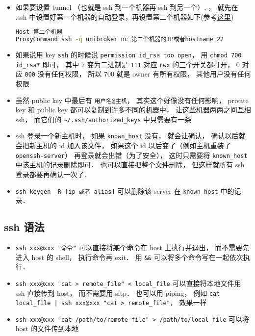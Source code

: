 \begin{itemize}
\item 如果要设置 tunnel （也就是 ssh 到一个机器再 ssh 到另一个）, ， 就先在 .ssh 中设置好第一个机器的自动登录，再设置第二个机器如下(参考\href{https://askubuntu.com/questions/311447/how-do-i-ssh-to-machine-a-via-b-in-one-command}{这里})
\begin{lstlisting}[language=bash]
Host 第二个机器
ProxyCommand ssh -q unibroker nc 第二个机器的IP或者hostname 22
\end{lstlisting}

\item 如果说用 key \verb`ssh` 的时候说 \verb`permission id_rsa too open`， 用 \verb`chmod 700 id_rsa*` 即可， 其中 7 变为二进制是 \verb`111` 对应 \verb`rwx` 的三个开关都打开， 0 对应 \verb`000` 没有任何权限， 所以 700 就是 owner 有所有权限， 其他用户没有任何权限
\item 虽然 public key 中最后有 \verb`用户名@主机`， 其实这个好像没有任何影响， private key 和 public key 都可以复制到许多不同的机器中， 让这些机器两两之间互相 ssh， 而它们的 \verb`~/.ssh/authorized_keys` 中只需要有一条
\item ssh 登录一个新主机时， 如果 \verb`known_host` 没有， 就会让确认， 确认以后就会把新主机的 id 加入该文件， 如果这个 id 以后变了（例如主机重装了 \verb`openssh-server`） 再登录就会出错（为了安全）， 这时只需要将 \verb`known_host` 中该主机的记录删除即可． 也可以直接把整个文件删除， 但这样就所有 ssh 登录都要再确认一次了．
\item \verb|ssh-keygen -R [ip 或者 alias]| 可以删除该 server 在 \verb|known_host| 中的记录．
\end{itemize}

\subsection{ssh 语法}
\begin{itemize}
\item \verb`ssh xxx@xxx "命令"` 可以直接将某个命令在 host 上执行并退出， 而不需要先进入 host 的 shell， 执行命令再 exit． 用 \verb`&&` 可以将多个命令写在一起依次执行．
\item \verb`ssh xxx@xxx "cat > remote_file" < local_file` 可以直接将本地文件用 ssh 直接传到 host， 而不需要用 sftp． 也可以用 piping， 例如 \verb`cat local_file | ssh xxx@xxx "cat > remote_file"`， 效果一样
\item \verb`ssh xxx@xxx "cat /path/to/remote_file" > /path/to/local_file` 可以将 host 的文件传到本地
\end{itemize}

